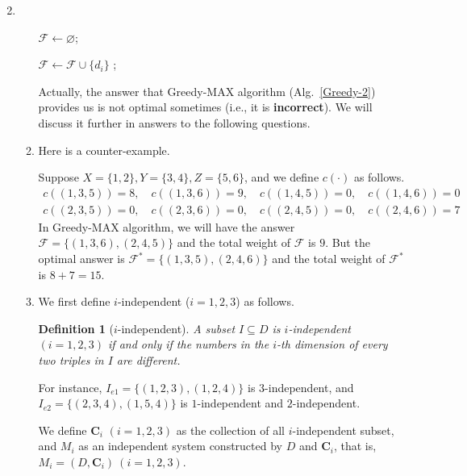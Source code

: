 \documentclass[12pt,a4paper]{article}
\makeatletter
\newtheorem*{solution}{Solution}
\newtheorem{definition}{Definition}
\theoremstyle{definition}
\renewenvironment{solution}[1][Solution] {\par\pushQED{\qed}\normalfont\topsep6\p@\@plus6\p@\relax\trivlist\item[\hskip\labelsep\bfseries#1\@addpunct{.}]\ignorespaces}{\popQED\endtrivlist\@endpefalse} \makeatother
\makeatother
\begin{document}
\begin{enumerate}
\begin{solution}
\begin{enumerate}
\begin{minipage}[t]{0.8\textwidth}
\begin{algorithm}[H]
            $\mathcal{F} \leftarrow \varnothing$;

             {
                 {
                    $\mathcal{F} \leftarrow \mathcal{F} \cup \{d_i\}$
                }
            }
            ;
        \end{algorithm}
        \end{minipage}

        Actually, the answer that Greedy-MAX algorithm (Alg.~\ref{Greedy-2}) provides us is not optimal sometimes (i.e., it is \textbf{incorrect}). We will discuss it further in answers to the following questions.
    \item Here is a counter-example.

        Suppose $X = \{1, 2\}, Y = \{3, 4\}, Z = \{5, 6\}$, and we define $c(\cdot)$ as follows.
        \begin{displaymath}
        \begin{aligned}
        c\left( (1,3,5) \right) = 8, \quad c\left( (1,3,6) \right) = 9, \quad c\left( (1,4,5) \right) = 0, \quad c\left( (1,4,6) \right) = 0 \\
        c\left( (2,3,5) \right) = 0, \quad c\left( (2,3,6) \right) = 0, \quad c\left( (2,4,5) \right) = 0, \quad c\left( (2,4,6) \right) = 7
        \end{aligned}
        \end{displaymath}
        In Greedy-MAX algorithm, we will have the answer $\mathcal{F} = \{ (1,3,6), (2,4,5) \}$ and the total weight of $\mathcal{F}$ is $9$. But the optimal answer is $\mathcal{F^*} = \{ (1,3,5), (2,4,6) \}$ and the total weight of $\mathcal{F^*}$ is $8 + 7 = 15$.

    \item We first define $i$-independent ($i = 1,2,3$) as follows.
        \begin{definition}[$i$-independent]
        A subset $I \subseteq D$ is $i$-independent $(i = 1,2,3)$ if and only if the numbers in the $i$-th dimension of every two triples in $I$ are different.
        \end{definition}
        For instance, $I_{e1} = \{ (1,2,3), (1,2,4) \}$ is $3$-independent, and $I_{e2} = \{ (2,3,4), (1,5,4) \}$ is $1$-independent and $2$-independent.

        We define $\mathbf{C}_i$ $(i = 1,2,3)$ as the collection of all $i$-independent subset, and $M_i$ as an independent system constructed by $D$ and $\mathbf{C}_i$, that is, $M_i = (D, \mathbf{C}_i)\ (i = 1,2,3)$.


\end{enumerate}
\end{solution}
\end{enumerate}
\end{document}
